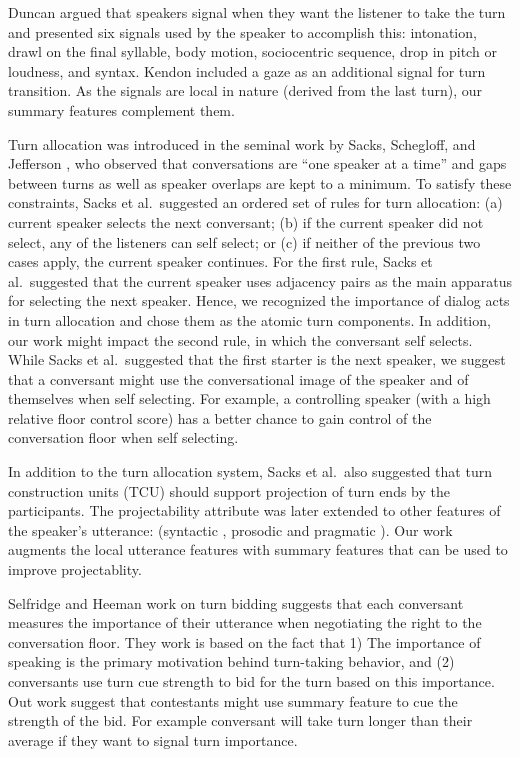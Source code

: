 Duncan \cite{duncan1972some} argued that speakers signal when they want the listener to take the turn and presented six signals used by the speaker to accomplish this: intonation, drawl on the final syllable, body motion, sociocentric sequence, drop in pitch or loudness, and syntax. Kendon \cite{kendon1967some} included a gaze as an additional signal for turn transition. As the signals are local in nature (derived from the last turn), our summary features complement them.


Turn allocation was introduced in the seminal work by Sacks, Schegloff, and Jefferson \cite{sacks1974simplest}, who observed that conversations are ``one speaker at a time'' and gaps between turns as well as speaker overlaps are kept to a minimum. To satisfy these constraints, Sacks et al.~suggested an ordered set of rules for turn allocation:
%
(a) current speaker selects the next conversant; (b) if the current speaker did not select, any of the listeners can self select; or (c) if neither of the previous two cases apply, the current speaker continues.
%
For the first rule, Sacks et al.~suggested that the current speaker uses adjacency pairs as the main apparatus for selecting the next speaker. Hence, we recognized the importance of dialog acts in turn allocation and chose them as the atomic turn components.
In addition, our work might impact the second rule, in which the conversant self selects. While Sacks et al.~suggested that the first starter is the next speaker, we suggest that a conversant might use the conversational image of the speaker and of themselves when self selecting. For example, a controlling speaker (with a high relative floor control score) has a better chance to gain control of the conversation floor when self selecting.

In addition to the turn allocation system, Sacks et al.~also suggested that turn construction units (TCU) should support projection of turn ends by the participants. The projectability attribute was later extended to other features of the speaker's utterance: (syntactic \cite{sacks1974simplest}, prosodic \cite{ford1996interactional} and pragmatic \cite{ford1996interactional,ford2001intersection}). Our work augments the local utterance features with summary features that can be used to improve projectablity.

Selfridge and Heeman \cite{SelfridgeHeeman10:acl} work on turn bidding suggests that each conversant measures the importance of their utterance when negotiating the right to the conversation floor. They work
is based on the fact that 1) The importance of speaking is the primary motivation behind turn-taking behavior, and (2) conversants use turn cue strength to bid for the turn based on this importance. Out work suggest that contestants might use summary feature to cue the strength of the bid. For example conversant will take turn longer than their average if they want to signal turn importance.



